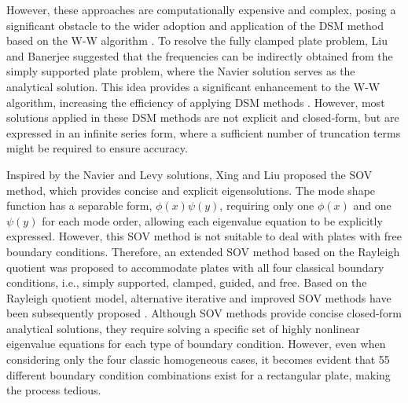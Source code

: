 \documentclass[preprint,12pt,number]{elsarticle}
\begin{document}
However, these approaches are computationally expensive and complex, posing a significant obstacle to the wider adoption and application of the DSM method based on the W-W algorithm \cite{han2018improved,liu2022closed}.
To resolve the fully clamped plate problem, Liu and Banerjee \cite{liu2015exact} suggested that the frequencies can be indirectly obtained from the simply supported plate problem, where the Navier solution serves as the analytical solution. 
This idea provides a significant enhancement to the W-W algorithm, increasing the efficiency of applying DSM methods \cite{liu2024wavenumber,zhou2024wavenumber}. 
However, most solutions applied in these DSM methods are not explicit and closed-form, but are expressed in an infinite series form, where a sufficient number of truncation terms might be required to ensure accuracy.

Inspired by the Navier and Levy solutions, Xing and Liu \cite{xing2009new} proposed the SOV method, which provides concise and explicit eigensolutions.
The mode shape function has a separable form, $\phi(x) \psi(y)$, requiring only one $\phi(x)$ and one $\psi(y)$ for each mode order, allowing each eigenvalue equation to be explicitly expressed.
However, this SOV method is not suitable to deal with plates with free boundary conditions.
Therefore, an extended SOV method \cite{xing2018overall, xing2020extended} based on the Rayleigh quotient was proposed to accommodate plates with all four classical boundary conditions, i.e., simply supported, clamped, guided, and free.
Based on the Rayleigh quotient model, alternative iterative and improved SOV methods have been subsequently proposed \cite{xing2020improved}.
Although SOV methods provide concise closed-form analytical solutions, they require solving a specific set of highly nonlinear eigenvalue equations for each type of boundary condition.
However, even when considering only the four classic homogeneous cases, it becomes evident that 55 different boundary condition combinations exist for a rectangular plate, making the process tedious.
\end{document}

